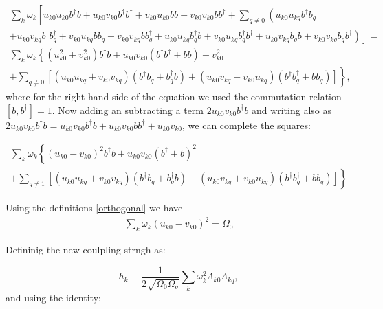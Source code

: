 \documentclass[%
preprint,
onecolumn,
notitlepag,
 amsmath,amssymb,
 aps,
 pra,
]{revtex4-2}
\begin{document}
\begin{itemize}
\begin{multline}
\sum_{k}\omega_{k}\left[
u_{k0} u_{k0} b^{\dagger} b + u_{k0} v_{k0} b^{\dagger} b^{\dagger} +
 v_{k0} u_{k0} b b + v_{k0} v_{k0} b b^{\dagger} + \sum_{q \neq 0 } \left( u_{k0 } u_{kq } b^{\dagger} b_q \right. \right. \\ 
 \left. \left. + u_{k0 } v_{kq } b^{\dagger} b_q^{\dagger} + v_{k0 } u_{kq } b b_q + v_{k0 } v_{kq } b b_q^{\dagger} +  u_{k0 } u_{kq } b_q^{\dagger} b + v_{k0 } u_{kq } b_q^{\dagger} b^{\dagger} + u_{k0} v_{kq } b_q b + v_{k0 } v_{kq } b_q b^{\dagger}\right)
     \right] = \\
     \sum_{k}\omega_{k}\left\{ (u_{k0}^2 + v_{k0}^2) b^{\dagger} b + u_{k0} v_{k0} (b^{\dagger} b^{\dagger} + b b) + v_{k0}^2 \right.\\ 
     \left. + \sum_{q \neq 0 }\left[ (u_{k0 } u_{kq } + v_{k0 } v_{kq})( b^{\dagger} b_{q} + b_{q}^{\dagger} b)+ (u_{k0} v_{kq} + v_{k0} u_{kq}) ( b^{\dagger} b_{q}^{\dagger} + b b_{q}) \right]\right\},
\end{multline}
where for the right hand side of the equation we used the commutation relation $[b,b^{\dagger}] = 1$. Now adding an subtracting a  term $2  u_{k0} v_{k0} b^{\dagger} b $ and writing also as $2  u_{k0} v_{k0} b^{\dagger} b =  u_{k0} v_{k0} b^{\dagger} b+ u_{k0} v_{k0}b b^{\dagger} + u_{k0} v_{k0}  $, we can complete the squares:

\begin{equation}
\begin{array}{c}
\sum_{k} \omega_{k}\left\{\left(u_{k 0}-v_{k 0}\right)^2 b^{\dagger} b+u_{k 0} v_{k 0}\left(b^{\dagger}+b \right)^2 \right. \\
\left.+\sum_{q \neq 1}\left[\left(u_{k 0} u_{k q}+v_{k 0} v_{k q}\right)\left(b^{\dagger} b_{q}+b_{q}^{\dagger} b\right)+\left(u_{k 0} v_{k q}+v_{k 0} u_{k q}\right)\left(b^{\dagger} b_{q}^{\dagger}+b b_{q}\right)\right]\right\}
\end{array}
\end{equation}



Using  the definitions \eqref{orthogonal} we have
\begin{align}
     \sum_{k} \omega_{k} (u_{k0} - v_{k0})^2= \Omega_0
\end{align}

Defininig the new coulpling strngh as:

\begin{equation}
    h_{k} \equiv \frac{1}{2\sqrt{\Omega_{0} \Omega_{q}}} \sum_{k} \omega_{k}^{2} \Lambda_{k0}\Lambda_{kq},
\end{equation}
and using the identity:


\end{itemize}
\end{document}
